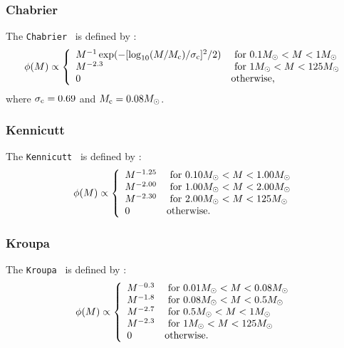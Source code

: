 \subsubsection{Chabrier}

The {\tt Chabrier} \IMF\ is defined by \citep{chabrier_galactic_2001}:
\begin{equation}
 \phi(M) \propto \left\{ \begin{array}{ll}
 M^{-1} \exp(-[\log_{10}(M/M_{\rm c})/\sigma_{\rm c}]^2/2) & \hbox{ for } 0.1M_\odot < M < 1M_\odot \\
 M^{-2.3} & \hbox{ for } 1M_\odot < M < 125M_\odot \\
 0 & \hbox {otherwise,} \end{array} \right.
\end{equation}
where $\sigma_{\rm c}=0.69$ and $M_{\rm c}=0.08M_\odot$.

\subsubsection{Kennicutt}

The {\tt Kennicutt} \IMF\ is defined by \citep{kennicutt_rate_1983}:
\begin{equation}
 \phi(M) \propto \left\{ \begin{array}{ll}
 M^{-1.25} & \hbox{ for } 0.10M_\odot < M < 1.00M_\odot \\
 M^{-2.00} & \hbox{ for } 1.00M_\odot < M < 2.00M_\odot \\
 M^{-2.30} & \hbox{ for } 2.00M_\odot < M < 125M_\odot \\
 0 & \hbox {otherwise.} \end{array} \right.
\end{equation}

\subsubsection{Kroupa}

The {\tt Kroupa} \IMF\ is defined by \citep{kroupa_variation_2001}:
\begin{equation}
 \phi(M) \propto \left\{ \begin{array}{ll}
 M^{-0.3} & \hbox{ for } 0.01M_\odot < M < 0.08M_\odot \\ 
 M^{-1.8} & \hbox{ for } 0.08M_\odot < M < 0.5M_\odot \\ 
 M^{-2.7} & \hbox{ for } 0.5M_\odot < M < 1M_\odot \\ 
 M^{-2.3} & \hbox{ for } 1M_\odot < M < 125M_\odot \\ 
0 & \hbox {otherwise.} \end{array} \right.
\end{equation}

